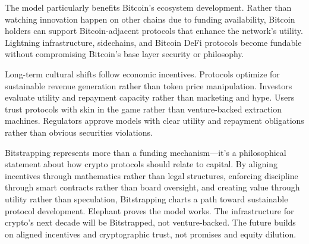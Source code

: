 The model particularly benefits Bitcoin's ecosystem development. Rather than watching innovation happen on other chains due to funding availability, Bitcoin holders can support Bitcoin-adjacent protocols that enhance the network's utility. Lightning infrastructure, sidechains, and Bitcoin DeFi protocols become fundable without compromising Bitcoin's base layer security or philosophy.

Long-term cultural shifts follow economic incentives. Protocols optimize for sustainable revenue generation rather than token price manipulation. Investors evaluate utility and repayment capacity rather than marketing and hype. Users trust protocols with skin in the game rather than venture-backed extraction machines. Regulators approve models with clear utility and repayment obligations rather than obvious securities violations.

Bitstrapping represents more than a funding mechanism—it's a philosophical statement about how crypto protocols should relate to capital. By aligning incentives through mathematics rather than legal structures, enforcing discipline through smart contracts rather than board oversight, and creating value through utility rather than speculation, Bitstrapping charts a path toward sustainable protocol development. Elephant proves the model works. The infrastructure for crypto's next decade will be Bitstrapped, not venture-backed. The future builds on aligned incentives and cryptographic trust, not promises and equity dilution.